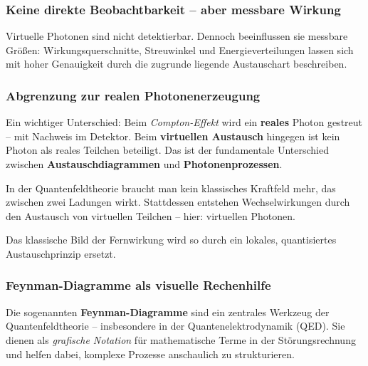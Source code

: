 \subsubsection*{Keine direkte Beobachtbarkeit – aber messbare Wirkung}
Virtuelle Photonen sind nicht detektierbar. Dennoch beeinflussen sie messbare Größen: Wirkungsquerschnitte, Streuwinkel und Energieverteilungen lassen sich mit hoher Genauigkeit durch die zugrunde liegende Austauschart beschreiben.

\subsubsection*{Abgrenzung zur realen Photonenerzeugung}
Ein wichtiger Unterschied: Beim \emph{Compton-Effekt} wird ein \textbf{reales} Photon gestreut – mit Nachweis im Detektor. Beim \textbf{virtuellen Austausch} hingegen ist kein Photon als reales Teilchen beteiligt. Das ist der fundamentale Unterschied zwischen \textbf{Austauschdiagrammen} und \textbf{Photonenprozessen}.

\vspace{1em}

\begin{tcolorbox}[didaktikbox, title=Keine „unsichtbare Kraft“ mehr nötig]
	\label{box:unsichtbare Kraft}
	In der Quantenfeldtheorie braucht man kein klassisches Kraftfeld mehr, das zwischen zwei Ladungen wirkt. Stattdessen entstehen Wechselwirkungen durch den Austausch von virtuellen Teilchen – hier: virtuellen Photonen.
	
	Das klassische Bild der Fernwirkung wird so durch ein lokales, quantisiertes Austauschprinzip ersetzt.
\end{tcolorbox}

\subsubsection{Feynman-Diagramme als visuelle Rechenhilfe}

Die sogenannten \textbf{Feynman-Diagramme} sind ein zentrales Werkzeug der Quantenfeldtheorie – insbesondere in der Quantenelektrodynamik (QED). Sie dienen als \emph{grafische Notation} für mathematische Terme in der Störungsrechnung und helfen dabei, komplexe Prozesse anschaulich zu strukturieren.

